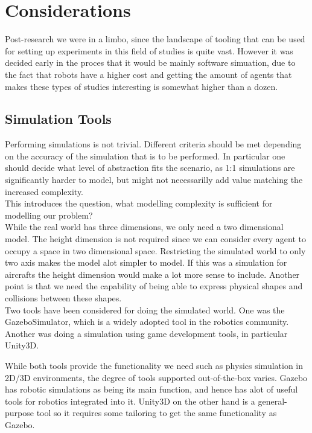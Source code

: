 \documentclass[titlepage]{article}
\begin{document}
\section{Considerations}
Post-research we were in a limbo, since the landscape of tooling that can be used for setting up experiments in this field of studies is  quite  vast.
However it was decided early in the proces that it would be mainly software simuation, due to the fact that robots have a higher cost and getting the amount of agents that makes these types of studies interesting is somewhat higher than a dozen.

\subsection{Simulation Tools}
Performing simulations is not trivial. Different criteria should be met depending on the accuracy of the simulation that is to be performed.
In particular one should decide what level of abstraction fits the scenario, as 1:1 simulations are significantly harder to model, but might not necessarilly add value matching the increased complexity.\\

This introduces the question, what modelling complexity is sufficient for modelling our problem?\\

While the real world has three dimensions, we only need a two dimensional model.
The height dimension is not required since we can consider every agent to occupy a space in two dimensional space.
Restricting the simulated world to only two axis makes the model alot simpler to model.
If this was a simulation for aircrafts the height dimension would make a lot more sense to include.
Another point is that we need the capability of being able to express physical shapes and collisions between these shapes.\\

Two tools have been considered for doing the simulated world. One was the GazeboSimulator, which is a widely adopted tool in the robotics community.
Another was doing a simulation using game development tools, in particular Unity3D.

While both tools provide the functionality we need such as physics simulation in 2D/3D  environments, the degree of tools supported out-of-the-box varies.
Gazebo has robotic simulations as being its main function, and hence has alot of useful tools for robotics integrated into it.
Unity3D on the other hand is a general-purpose tool so it requires some tailoring to get the same functionality as Gazebo.
\end{document}
